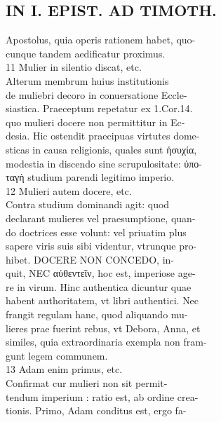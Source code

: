 \documentclass{article}
\begin{document}
\begin{pages}
\section*{IN I. EPIST. AD TIMOTH. \\
                }
Apostolus, quia operis rationem habet, quo- \\
                cunque tandem aedificatur proximus. \\
                11 Mulier in silentio discat, etc. \\
                Alterum membrum huius institutionis \\
                de muliebri decoro in conuersatione Eccle- \\
                siastica. Praeceptum repetatur ex 1.Cor.14. \\
                quo mulieri docere non permittitur in Ec- \\
                desia. Hic ostendit praecipuas virtutes dome- \\
                sticas in causa religionis, quales sunt ἡσυχία, \\
                modestia in discendo sine scrupulositate: ὑπο- \\
                ταγὴ studium parendi legitimo imperio. \\
                12 Mulieri autem docere, etc. \\
                Contra studium dominandi agit: quod \\
                declarant mulieres vel praesumptione, quan- \\
                do doctrices esse volunt: vel priuatim plus \\
                sapere viris suis sibi videntur, vtrunque pro- \\
                hibet. DOCERE NON CONCEDO, in- \\
                quit, NEC αὐθεντεῖν, hoc est, imperiose age- \\
                re in virum. Hinc authentica dicuntur quae \\
                habent authoritatem, vt libri authentici. Nec \\
                frangit regulam hanc, quod aliquando mu- \\
                lieres prae fuerint rebus, vt Debora, Anna, et \\
                similes, quia extraordinaria exempla non fram- \\
                gunt legem communem. \\
                13 Adam enim primus, etc. \\
                Confirmat cur mulieri non sit permit- \\
                tendum imperium : ratio est, ab ordine crea- \\
                tionis. Primo, Adam conditus est, ergo fa- \\
                

\end{pages}
\end{document}
